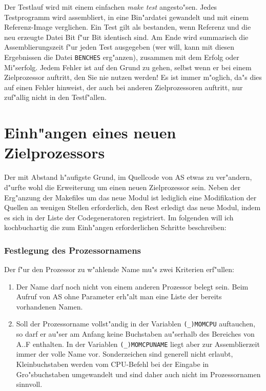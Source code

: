 \documentclass[12pt,a4paper,twoside]{report}
\newcommand{\asname}{AS}
\newcommand{\predefsym}[1]{{\tt (\_)#1}}
\begin{document}
Der Testlauf wird mit einem einfachen {\em make test} angesto"sen.  Jedes
Testprogramm wird assembliert, in eine Bin"ardatei gewandelt und mit einem
Referenz-Image verglichen.  Ein Test gilt als bestanden, wenn Referenz und
die neu erzeugte Datei Bit f"ur Bit identisch sind.  Am Ende wird
summarisch die Assemblierungszeit f"ur jeden Test ausgegeben (wer will,
kann mit diesen Ergebnissen die Datei {\tt BENCHES} erg"anzen), zusammen
mit dem Erfolg oder Mi"serfolg.  Jedem Fehler ist auf den Grund zu gehen,
selbst wenn er bei einem Zielprozessor auftritt, den Sie nie nutzen
werden!  Es ist immer m"oglich, da"s dies auf einen Fehler hinweist, der
auch bei anderen Zielprozessoren auftritt, nur zuf"allig nicht in den
Testf"allen.


\section{Einh"angen eines neuen Zielprozessors}

Der mit Abstand h"aufigste Grund, im Quellcode von \asname{} etwas zu ver"andern,
d"urfte wohl die Erweiterung um einen neuen Zielprozessor sein.  Neben der
Erg"anzung der Makefiles um das neue Modul ist lediglich eine Modifikation
der Quellen an wenigen Stellen erforderlich, den Rest erledigt das neue
Modul, indem es sich in der Liste der Codegeneratoren registriert.  Im
folgenden will ich kochbuchartig die zum Einh"angen erforderlichen
Schritte beschreiben:

\subsubsection{Festlegung des Prozessornamens}

Der f"ur den Prozessor zu w"ahlende Name mu"s zwei Kriterien erf"ullen:
\begin{enumerate}
\item{Der Name darf noch nicht von einem anderen Prozessor belegt sein.
      Beim Aufruf von \asname{} ohne Parameter erh"alt man eine Liste der bereits
      vorhandenen Namen.}
\item{Soll der Prozessorname vollst"andig in der Variablen \predefsym{MOMCPU}
      auftauchen, so darf er au"ser am Anfang keine Buchstaben au"serhalb
      des Bereiches von A..F enthalten.  In der Variablen \predefsym{MOMCPUNAME}
      liegt aber zur Assemblierzeit immer der volle Name vor.
      Sonderzeichen sind generell nicht erlaubt, Kleinbuchstaben
      werden vom CPU-Befehl bei der Eingabe in Gro"sbuchstaben umgewandelt
      und sind daher auch nicht im Prozessornamen sinnvoll.}
\end{enumerate}
\end{document}
